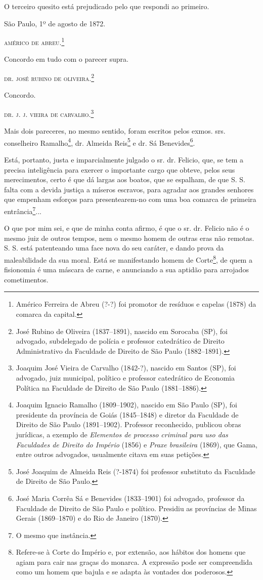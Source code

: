 O terceiro quesito está prejudicado pelo que respondi ao primeiro.

São Paulo, 1º de agosto de 1872.

\textsc{américo de abreu}.\footnote{ Américo Ferreira de Abreu (?-?) foi promotor
  de resíduos e capelas (1878) da comarca da capital.}

Concordo em tudo com o parecer supra.

\textsc{dr. josé rubino de oliveira}.\footnote{ José Rubino de Oliveira
  (1837--1891), nascido em Sorocaba (SP), foi advogado, subdelegado de
  polícia e professor catedrático de Direito Administrativo da Faculdade
  de Direito de São Paulo (1882--1891).}

Concordo.

\textsc{dr. j. j. vieira de carvalho}.\footnote{ Joaquim José Vieira de Carvalho
  (1842-?), nascido em Santos (SP), foi advogado, juiz municipal,
  político e professor catedrático de Economia Política na Faculdade de
  Direito de São Paulo (1881--1886).}

Mais dois pareceres, no mesmo sentido, foram escritos pelos exmos. srs.
conselheiro Ramalho\footnote{ Joaquim Ignacio Ramalho (1809--1902),
  nascido em São Paulo (SP), foi presidente da província de Goiás
  (1845--1848) e diretor da Faculdade de Direito de São Paulo
  (1891--1902). Professor reconhecido, publicou obras jurídicas, a
  exemplo de \emph{Elementos de processo criminal para uso das
  Faculdades de Direito do Império} (1856) e \emph{Praxe brasileira}
  (1869), que Gama, entre outros advogados, usualmente citava em suas
  petições.}, dr. Almeida Reis\footnote{ José Joaquim de Almeida Reis
  (?-1874) foi professor substituto da Faculdade de Direito de São
  Paulo.} e dr. Sá Benevides\footnote{ José Maria Corrêa Sá e Benevides
  (1833--1901) foi advogado, professor da Faculdade de Direito de São
  Paulo e político. Presidiu as províncias de Minas Gerais (1869--1870) e
  do Rio de Janeiro (1870).}.

Está, portanto, justa e imparcialmente julgado o sr. dr. Felicio, que,
se tem a precisa inteligência para exercer o importante cargo que
obteve, pelos seus merecimentos, certo é que dá largas aos boatos, que
se espalham, de que S. S. falta com a devida justiça a míseros escravos,
para agradar aos grandes senhores que empenham esforços para
presentearem-no com uma boa comarca de primeira entrância\footnote{ O
  mesmo que instância.}...

O que por mim sei, e que de minha conta afirmo, é que o sr. dr. Felicio
não é o mesmo juiz de outros tempos, nem o mesmo homem de outras eras
não remotas. S. S. está patenteando uma face nova do seu caráter, e
dando prova da maleabilidade da sua moral. Está se manifestando homem de
Corte\footnote{ Refere-se à Corte do Império e, por extensão, aos
  hábitos dos homens que agiam para cair nas graças do monarca. A
  expressão pode ser compreendida como um homem que bajula e se adapta
  às vontades dos poderosos.}, de quem a fisionomia é uma máscara de
carne, e anunciando a sua aptidão para arrojados cometimentos.

